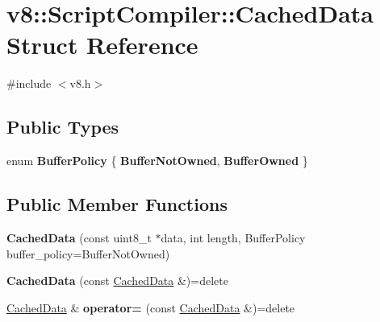 \hypertarget{structv8_1_1ScriptCompiler_1_1CachedData}{}\section{v8\+:\+:Script\+Compiler\+:\+:Cached\+Data Struct Reference}
\label{structv8_1_1ScriptCompiler_1_1CachedData}


{\ttfamily \#include $<$v8.\+h$>$}

\subsection*{Public Types}
\begin{DoxyCompactItemize}
\item 
\mbox{\label{structv8_1_1ScriptCompiler_1_1CachedData_ac1a1055d361e89b589c3fa98b79b9c25}} 
enum {\bfseries Buffer\+Policy} \{ {\bfseries Buffer\+Not\+Owned}, 
{\bfseries Buffer\+Owned}
 \}
\end{DoxyCompactItemize}
\subsection*{Public Member Functions}
\begin{DoxyCompactItemize}
\item 
\mbox{\label{structv8_1_1ScriptCompiler_1_1CachedData_ab45b2bd22aa86eafd0b8eecbdc72d44e}} 
{\bfseries Cached\+Data} (const uint8\+\_\+t $\ast$data, int length, Buffer\+Policy buffer\+\_\+policy=Buffer\+Not\+Owned)
\item 
\mbox{\label{structv8_1_1ScriptCompiler_1_1CachedData_a50459db5fa0e01db839bcf14f786fa56}} 
{\bfseries Cached\+Data} (const \mbox{\hyperlink{structv8_1_1ScriptCompiler_1_1CachedData}{Cached\+Data}} \&)=delete
\item 
\mbox{\label{structv8_1_1ScriptCompiler_1_1CachedData_a6327b06938eba983da41bb1579195442}} 
\mbox{\hyperlink{structv8_1_1ScriptCompiler_1_1CachedData}{Cached\+Data}} \& {\bfseries operator=} (const \mbox{\hyperlink{structv8_1_1ScriptCompiler_1_1CachedData}{Cached\+Data}} \&)=delete
\end{DoxyCompactItemize}
